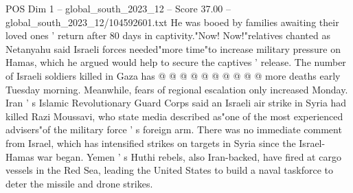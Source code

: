 \begin{textsample}{POS Dim 1 – global\_south\_2023\_12 – Score 37.00 – global\_south\_2023\_12/104592601.txt}
He was booed by families awaiting their loved ones ' return after 80 days in captivity."Now!
Now!"relatives chanted as Netanyahu said Israeli forces needed"more time"to increase military pressure on Hamas, which he argued would help to secure the captives ' release.
The number of Israeli soldiers killed in Gaza has @ @ @ @ @ @ @ @ @ @ more deaths early Tuesday morning.
Meanwhile, fears of regional escalation only increased Monday.
Iran ' s Islamic Revolutionary Guard Corps said an Israeli air strike in Syria had killed Razi Moussavi, who state media described as"one of the most experienced advisers"of the military force ' s foreign arm.
There was no immediate comment from Israel, which has intensified strikes on targets in Syria since the Israel-Hamas war began.
Yemen ' s Huthi rebels, also Iran-backed, have fired at cargo vessels in the Red Sea, leading the United States to build a naval taskforce to deter the missile and drone strikes.

\end{textsample}
